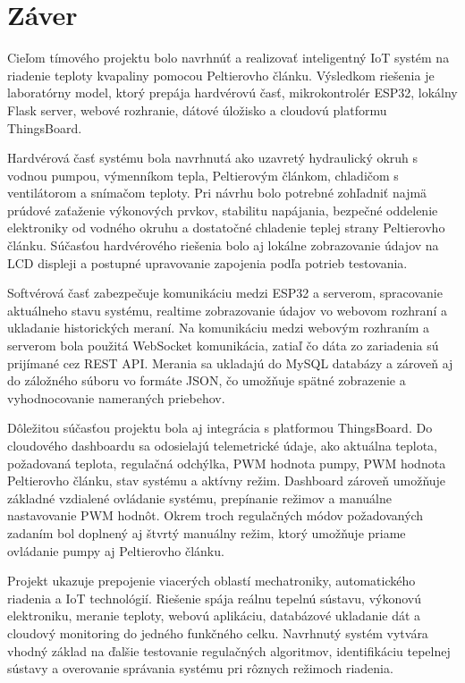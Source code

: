 \section{Záver}

Cieľom tímového projektu bolo navrhnúť a realizovať inteligentný IoT systém 
na riadenie teploty kvapaliny pomocou Peltierovho článku. Výsledkom riešenia 
je laboratórny model, ktorý prepája hardvérovú časť, mikrokontrolér ESP32, 
lokálny Flask server, webové rozhranie, dátové úložisko a cloudovú platformu ThingsBoard.

Hardvérová časť systému bola navrhnutá ako uzavretý hydraulický okruh s vodnou pumpou, 
výmenníkom tepla, Peltierovým článkom, chladičom s ventilátorom a snímačom teploty. 
Pri návrhu bolo potrebné zohľadniť najmä prúdové zaťaženie výkonových prvkov, 
stabilitu napájania, bezpečné oddelenie elektroniky od vodného okruhu a dostatočné 
chladenie teplej strany Peltierovho článku. Súčasťou hardvérového riešenia bolo 
aj lokálne zobrazovanie údajov na LCD displeji a postupné upravovanie zapojenia 
podľa potrieb testovania.

Softvérová časť zabezpečuje komunikáciu medzi ESP32 a serverom, spracovanie aktuálneho stavu systému, 
realtime zobrazovanie údajov vo webovom rozhraní a ukladanie historických meraní. 
Na komunikáciu medzi webovým rozhraním a serverom bola použitá WebSocket komunikácia, 
zatiaľ čo dáta zo zariadenia sú prijímané cez REST API. Merania sa ukladajú do MySQL databázy 
a zároveň aj do záložného súboru vo formáte JSON, čo umožňuje spätné zobrazenie a 
vyhodnocovanie nameraných priebehov.

Dôležitou súčasťou projektu bola aj integrácia s platformou ThingsBoard. 
Do cloudového dashboardu sa odosielajú telemetrické údaje, ako aktuálna teplota, 
požadovaná teplota, regulačná odchýlka, PWM hodnota pumpy, PWM hodnota Peltierovho článku, 
stav systému a aktívny režim. Dashboard zároveň umožňuje základné vzdialené ovládanie systému, 
prepínanie režimov a manuálne nastavovanie PWM hodnôt. Okrem troch regulačných módov požadovaných 
zadaním bol doplnený aj štvrtý manuálny režim, ktorý umožňuje priame ovládanie pumpy aj Peltierovho článku.

Projekt ukazuje prepojenie viacerých oblastí mechatroniky, automatického riadenia a IoT technológií. 
Riešenie spája reálnu tepelnú sústavu, výkonovú elektroniku, meranie teploty, webovú aplikáciu, 
databázové ukladanie dát a cloudový monitoring do jedného funkčného celku. Navrhnutý systém vytvára 
vhodný základ na ďalšie testovanie regulačných algoritmov, identifikáciu tepelnej sústavy a overovanie 
správania systému pri rôznych režimoch riadenia.

